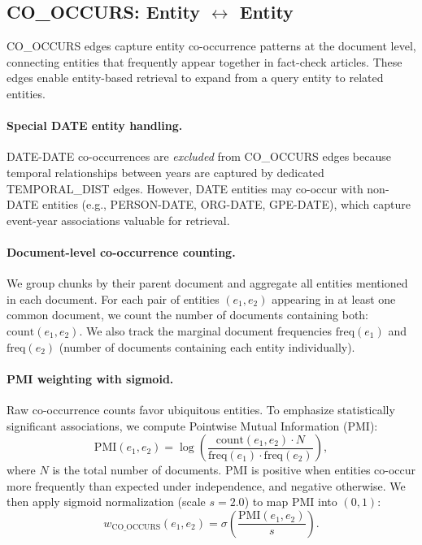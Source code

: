 \documentclass[10pt]{article}
\begin{document}
\subsection{CO\_OCCURS: Entity $\leftrightarrow$ Entity}

CO\_OCCURS edges capture entity co-occurrence patterns at the document level, connecting entities that frequently appear together in fact-check articles. These edges enable entity-based retrieval to expand from a query entity to related entities.

\paragraph{Special DATE entity handling.} DATE-DATE co-occurrences are \emph{excluded} from CO\_OCCURS edges because temporal relationships between years are captured by dedicated TEMPORAL\_DIST edges. However, DATE entities may co-occur with non-DATE entities (e.g., PERSON-DATE, ORG-DATE, GPE-DATE), which capture event-year associations valuable for retrieval.

\paragraph{Document-level co-occurrence counting.} We group chunks by their parent document and aggregate all entities mentioned in each document. For each pair of entities $(e_1, e_2)$ appearing in at least one common document, we count the number of documents containing both: $\text{count}(e_1, e_2)$. We also track the marginal document frequencies $\text{freq}(e_1)$ and $\text{freq}(e_2)$ (number of documents containing each entity individually).

\paragraph{PMI weighting with sigmoid.} Raw co-occurrence counts favor ubiquitous entities. To emphasize statistically significant associations, we compute Pointwise Mutual Information (PMI):
\[
\text{PMI}(e_1, e_2) = \log\left(\frac{\text{count}(e_1, e_2) \cdot N}{\text{freq}(e_1) \cdot \text{freq}(e_2)}\right),
\]
where $N$ is the total number of documents. PMI is positive when entities co-occur more frequently than expected under independence, and negative otherwise. We then apply sigmoid normalization (scale $s=2.0$) to map PMI into $(0,1)$:
\[
w_{\text{CO\_OCCURS}}(e_1, e_2) = \sigma\left(\frac{\text{PMI}(e_1, e_2)}{s}\right).
\]
\end{document}
